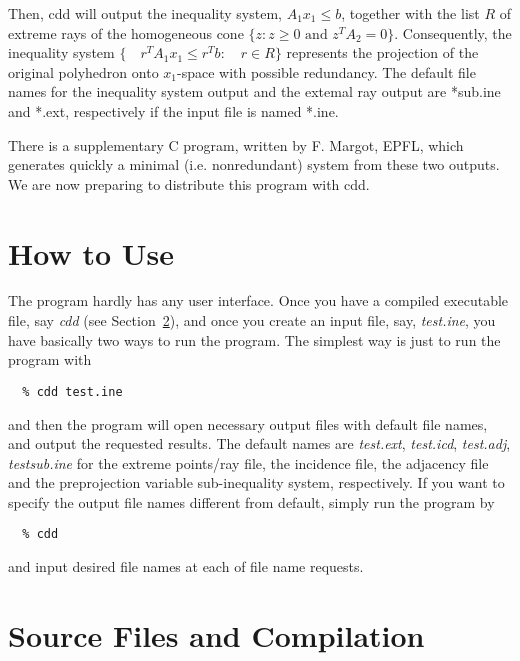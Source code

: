 \begin{description}
Then, cdd will output the inequality system,
$A_1 x_1  \le b$, together with the list $R$ of extreme
rays of the homogeneous cone  $\{z:  z  \ge 0  \mbox{ and }  z^T A_2 = 0 \}$.  
Consequently, the inequality system
$\{ \quad r^T A_1  x_1  \le  r^T b : \quad r \in  R \}$
represents the projection of the original polyhedron onto
$x_1$-space with possible redundancy.  The default file names
for the inequality system output and the extemal ray output are
*sub.ine and *.ext, respectively if the input file is named *.ine.  

There is a supplementary  C program, 
written by F. Margot, EPFL, which generates quickly a minimal
(i.e. nonredundant) system from these two outputs.
We are now preparing to distribute this program with cdd.
\end{description}

\section{How to Use}  \label{HOWTO}

The program hardly has any user interface.  Once you have a compiled
executable file, say {\em cdd\/} (see Section~\ref{CAUTIONS}), 
and once you create an input file,
say, {\em test.ine\/}, you have basically two ways to run the program.
The simplest way is just to run the program with 
\begin{verbatim}
  % cdd test.ine
\end{verbatim}
and then the program will open necessary output files with
default file names, and output the requested results.
The default names are {\em test.ext\/}, {\em test.icd\/}, {\em test.adj\/},
{\em testsub.ine\/} for the extreme points/ray file, the incidence
file, the adjacency file and the preprojection variable sub-inequality
system, respectively.  If you want to specify the output file names
different from default, simply run the program by
\begin{verbatim}
  % cdd
\end{verbatim}
and input desired file names at each of file name requests.

\section{Source Files and Compilation}  \label{CAUTIONS}

